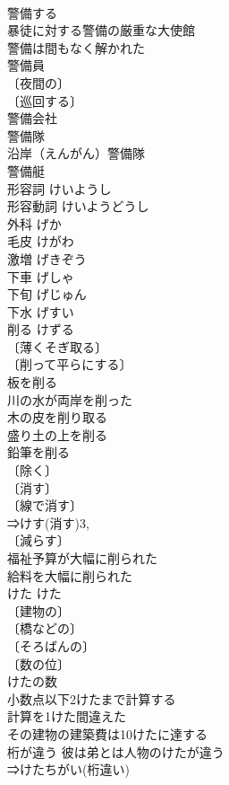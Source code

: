 \documentclass[8pt]{extreport}
\begin{document}
\begin{CJK}{UTF8}{min}
\\	警備する 
\\	暴徒に対する警備の厳重な大使館 
\\	警備は間もなく解かれた 
\\	警備員 
\\	〔夜間の〕
\\	〔巡回する〕
\\	警備会社 
\\	警備隊 
\\	沿岸（えんがん）警備隊 
\\	警備艇 
\\	形容詞	けいようし	
\\	形容動詞	けいようどうし	
\\	外科	げか	
\\	毛皮	けがわ	
\\	激増	げきぞう	
\\	下車	げしゃ	
\\	下旬	げじゅん	
\\	下水	げすい	
\\	削る	けずる	
\\	〔薄くそぎ取る〕
\\	〔削って平らにする〕
\\	板を削る 
\\	川の水が両岸を削った 
\\	木の皮を削り取る 
\\	盛り土の上を削る 
\\	鉛筆を削る 
\\	〔除く〕
\\	〔消す〕
\\	〔線で消す〕
\\	⇒けす(消す)3, 
\\	〔減らす〕
\\	福祉予算が大幅に削られた 
\\	給料を大幅に削られた 
\\	けた	けた	
\\	〔建物の〕
\\	〔橋などの〕
\\	〔そろばんの〕
\\	〔数の位〕
\\	けたの数 
\\	小数点以下2けたまで計算する 
\\	計算を1けた間違えた 
\\	その建物の建築費は10けたに達する 
\\	桁が違う 彼は弟とは人物のけたが違う 
\\	⇒けたちがい(桁違い)

\end{CJK}
\end{document}
